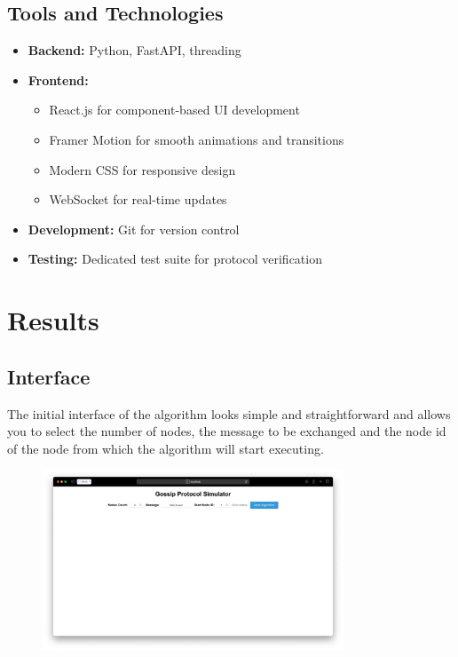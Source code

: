 \documentclass[a4paper,12pt]{article}
\begin{document}
\subsection{Tools and Technologies}
\begin{itemize}
    \item \textbf{Backend:} Python, FastAPI, threading
    \item \textbf{Frontend:} 
        \begin{itemize}
            \item React.js for component-based UI development
            \item Framer Motion for smooth animations and transitions
            \item Modern CSS for responsive design
            \item WebSocket for real-time updates
        \end{itemize}
    \item \textbf{Development:} Git for version control
    \item \textbf{Testing:} Dedicated test suite for protocol verification
\end{itemize}

\section{Results}

\subsection{Interface}
The initial interface of the algorithm looks simple and straightforward and allows you to select the number of nodes, the message to be exchanged and the node id of the node from which the algorithm will start executing.
\begin{figure}[H]
    \centering
    \includegraphics[width=0.8\textwidth]{figures/interface.jpeg}
    \label{fig:screenshot1}
\end{figure}
\end{document}
